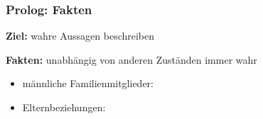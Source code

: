 \documentclass{beamer}
\begin{document}
\begin{frame}[fragile] \frametitle{Prolog: Fakten}
	\footnotesize
	
	\textbf{Ziel:} wahre Aussagen beschreiben
	
	
	\textbf{Fakten:} unabhängig von anderen Zuständen immer wahr
	
	\begin{itemize}
		\item männliche Familienmitglieder: \pause
		
		\begin{minipage}[t]{\dimexpr0.5\linewidth-\fboxrule-\fboxsep}
			
		\end{minipage}
		\begin{minipage}[t]{\dimexpr0.5\linewidth-\fboxrule-\fboxsep}
			
		\end{minipage} \pause
		\item Elternbeziehungen: \pause
		
		\begin{minipage}[t]{\dimexpr0.5\linewidth-\fboxrule-\fboxsep}
			
		\end{minipage}
		\begin{minipage}[t]{\dimexpr0.5\linewidth-\fboxrule-\fboxsep}
			
		\end{minipage} \pause
	\end{itemize}
\end{frame}
\end{document}
